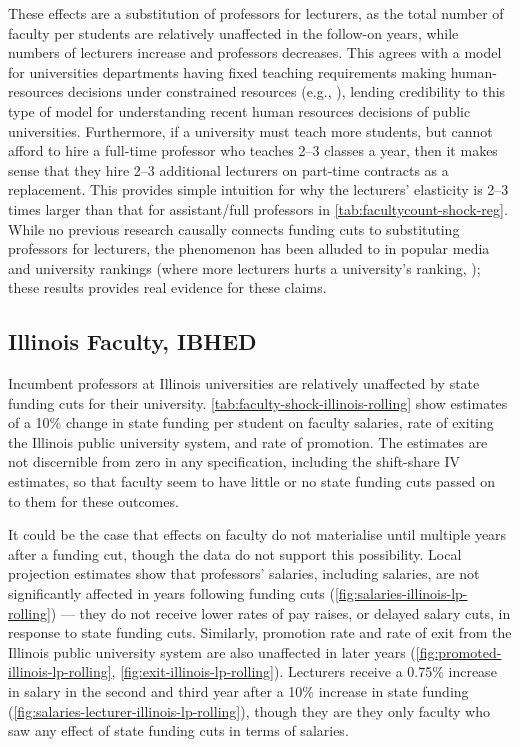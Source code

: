 These effects are a substitution of professors for lecturers, as the total number of faculty per students are relatively unaffected in the follow-on years, while numbers of lecturers increase and professors decreases.
This agrees with a model for universities departments having fixed teaching requirements making human-resources decisions under constrained resources (e.g., \citealt{abe2015implications}), lending credibility to this type of model for understanding recent human resources decisions of public universities.
Furthermore, if a university must teach more students, but cannot afford to hire a full-time professor who teaches 2--3 classes a year, then it makes sense that they hire 2--3 additional lecturers on part-time contracts as a replacement.
This provides simple intuition for why the lecturers' elasticity is 2--3 times larger than that for assistant/full professors in \autoref{tab:facultycount-shock-reg}.
While no previous research causally connects funding cuts to substituting professors for lecturers, the phenomenon has been alluded to in popular media \citep{wiu2016} and university rankings (where more lecturers hurts a university's ranking, \citealt{usnews2023}); these results provides real evidence for these claims.

\subsection{Illinois Faculty, IBHED}
Incumbent professors at Illinois universities are relatively unaffected by state funding cuts for their university.
\autoref{tab:faculty-shock-illinois-rolling} show estimates of a 10\% change in state funding per student on faculty salaries, rate of exiting the Illinois public university system, and rate of promotion.
The estimates are not discernible from zero in any specification, including the shift-share IV estimates, so that faculty seem to have little or no state funding cuts passed on to them for these outcomes.

It could be the case that effects on faculty do not materialise until multiple years after a funding cut, though the data do not support this possibility.
Local projection estimates show that professors' salaries, including salaries, are not significantly affected in years following funding cuts (\autoref{fig:salaries-illinois-lp-rolling}) --- they do not receive lower rates of pay raises, or delayed salary cuts, in response to state funding cuts.
Similarly, promotion rate and rate of exit from the Illinois public university system are also unaffected in later years (\autoref{fig:promoted-illinois-lp-rolling}, \ref{fig:exit-illinois-lp-rolling}).
Lecturers receive a 0.75\% increase in salary in the second and third year after a 10\% increase in state funding (\autoref{fig:salaries-lecturer-illinois-lp-rolling}), though they are they only faculty who saw any effect of state funding cuts in terms of salaries.

